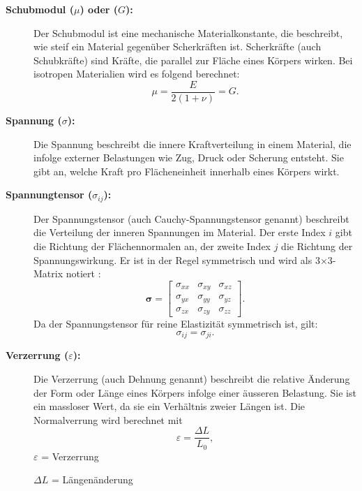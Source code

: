 \begin{description}
	\item[\textbf{Schubmodul ($\mu$) oder ($G$):}] Der Schubmodul ist eine mechanische Materialkonstante, die beschreibt, wie steif ein Material gegenüber Scherkräften ist.
	Scherkräfte (auch Schubkräfte) sind Kräfte, die parallel zur Fläche eines Körpers wirken. 
	Bei isotropen Materialien wird es folgend berechnet:
	\begin{equation}
		\mu = 
		\frac{E}{2(1 + \nu)} =
		G.
	\end{equation}
	\item[\textbf{Spannung ($\sigma$):}] Die Spannung beschreibt die innere Kraftverteilung in einem Material, die infolge externer Belastungen wie Zug, Druck oder Scherung entsteht. 
	Sie gibt an, welche Kraft pro Flächeneinheit innerhalb eines Körpers wirkt.
	
	\item[\textbf{Spannungtensor ($\sigma_{ij}$):}] Der Spannungstensor (auch Cauchy-Spannungstensor genannt) beschreibt die Verteilung der inneren Spannungen im Material. 
	Der erste Index	$i$ gibt die Richtung der Flächennormalen an, der zweite Index $j$ die Richtung der Spannungswirkung. 
	Er ist in der Regel symmetrisch und wird als 3×3-Matrix notiert \cite{elastomechanik:Grundlagen_der_Elastizitaetstheorie}:
	\begin{equation}
		\boldsymbol{\sigma} =
		\begin{bmatrix}
			\sigma_{xx} & \sigma_{xy} & \sigma_{xz} \\
			\sigma_{yx} & \sigma_{yy} & \sigma_{yz} \\
			\sigma_{zx} & \sigma_{zy} & \sigma_{zz}
		\end{bmatrix}.
	\end{equation}
	Da der Spannungstensor für reine Elastizität symmetrisch ist, gilt:
	\begin{equation}
		\sigma_{ij} = 
		\sigma_{ji}.
	\end{equation}
	\item[\textbf{Verzerrung ($\varepsilon$):}] Die Verzerrung (auch Dehnung genannt) beschreibt die relative Änderung der Form oder Länge eines Körpers infolge einer äusseren Belastung. 
	Sie ist ein massloser Wert, da sie ein Verhältnis zweier Längen ist.
	Die Normalverrung wird berechnet mit
	\begin{equation}
		\varepsilon 
		= \frac{\Delta L}{L_0},
	\end{equation}
	$\varepsilon$ = Verzerrung
	
	$\Delta L$ = Längenänderung
	

\end{description}
